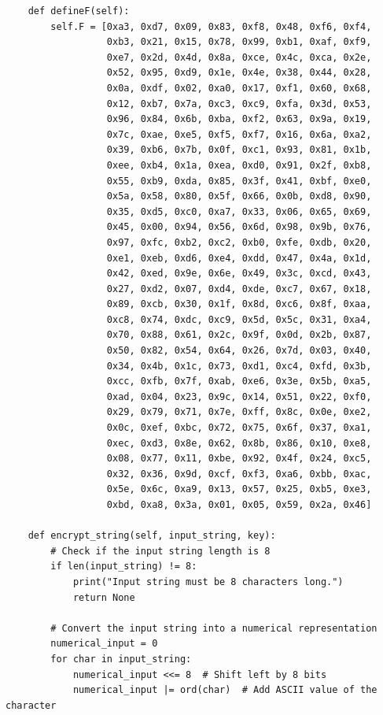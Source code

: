 \documentclass{article}
\begin{document}
\begin{verbatim}
    def defineF(self):
        self.F = [0xa3, 0xd7, 0x09, 0x83, 0xf8, 0x48, 0xf6, 0xf4, 
                  0xb3, 0x21, 0x15, 0x78, 0x99, 0xb1, 0xaf, 0xf9,
                  0xe7, 0x2d, 0x4d, 0x8a, 0xce, 0x4c, 0xca, 0x2e, 
                  0x52, 0x95, 0xd9, 0x1e, 0x4e, 0x38, 0x44, 0x28,
                  0x0a, 0xdf, 0x02, 0xa0, 0x17, 0xf1, 0x60, 0x68, 
                  0x12, 0xb7, 0x7a, 0xc3, 0xc9, 0xfa, 0x3d, 0x53,
                  0x96, 0x84, 0x6b, 0xba, 0xf2, 0x63, 0x9a, 0x19, 
                  0x7c, 0xae, 0xe5, 0xf5, 0xf7, 0x16, 0x6a, 0xa2,
                  0x39, 0xb6, 0x7b, 0x0f, 0xc1, 0x93, 0x81, 0x1b,
                  0xee, 0xb4, 0x1a, 0xea, 0xd0, 0x91, 0x2f, 0xb8,
                  0x55, 0xb9, 0xda, 0x85, 0x3f, 0x41, 0xbf, 0xe0,
                  0x5a, 0x58, 0x80, 0x5f, 0x66, 0x0b, 0xd8, 0x90,
                  0x35, 0xd5, 0xc0, 0xa7, 0x33, 0x06, 0x65, 0x69,
                  0x45, 0x00, 0x94, 0x56, 0x6d, 0x98, 0x9b, 0x76,
                  0x97, 0xfc, 0xb2, 0xc2, 0xb0, 0xfe, 0xdb, 0x20,
                  0xe1, 0xeb, 0xd6, 0xe4, 0xdd, 0x47, 0x4a, 0x1d,
                  0x42, 0xed, 0x9e, 0x6e, 0x49, 0x3c, 0xcd, 0x43,
                  0x27, 0xd2, 0x07, 0xd4, 0xde, 0xc7, 0x67, 0x18,
                  0x89, 0xcb, 0x30, 0x1f, 0x8d, 0xc6, 0x8f, 0xaa,
                  0xc8, 0x74, 0xdc, 0xc9, 0x5d, 0x5c, 0x31, 0xa4,
                  0x70, 0x88, 0x61, 0x2c, 0x9f, 0x0d, 0x2b, 0x87,
                  0x50, 0x82, 0x54, 0x64, 0x26, 0x7d, 0x03, 0x40,
                  0x34, 0x4b, 0x1c, 0x73, 0xd1, 0xc4, 0xfd, 0x3b,
                  0xcc, 0xfb, 0x7f, 0xab, 0xe6, 0x3e, 0x5b, 0xa5,
                  0xad, 0x04, 0x23, 0x9c, 0x14, 0x51, 0x22, 0xf0,
                  0x29, 0x79, 0x71, 0x7e, 0xff, 0x8c, 0x0e, 0xe2,
                  0x0c, 0xef, 0xbc, 0x72, 0x75, 0x6f, 0x37, 0xa1,
                  0xec, 0xd3, 0x8e, 0x62, 0x8b, 0x86, 0x10, 0xe8,
                  0x08, 0x77, 0x11, 0xbe, 0x92, 0x4f, 0x24, 0xc5,
                  0x32, 0x36, 0x9d, 0xcf, 0xf3, 0xa6, 0xbb, 0xac,
                  0x5e, 0x6c, 0xa9, 0x13, 0x57, 0x25, 0xb5, 0xe3,
                  0xbd, 0xa8, 0x3a, 0x01, 0x05, 0x59, 0x2a, 0x46]

    def encrypt_string(self, input_string, key):
        # Check if the input string length is 8
        if len(input_string) != 8:
            print("Input string must be 8 characters long.")
            return None

        # Convert the input string into a numerical representation
        numerical_input = 0
        for char in input_string:
            numerical_input <<= 8  # Shift left by 8 bits
            numerical_input |= ord(char)  # Add ASCII value of the character


\end{verbatim}
\end{document}
